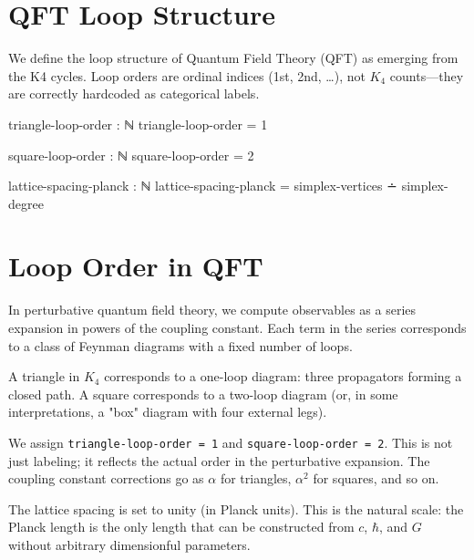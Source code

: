 \documentclass[11pt,a4paper]{book}
\begin{document}
\section{QFT Loop Structure}

We define the loop structure of Quantum Field Theory (QFT) as emerging from the K4 cycles.
Loop orders are ordinal indices (1st, 2nd, \ldots), not $K_4$ counts---they are correctly
hardcoded as categorical labels.

\begin{code}
triangle-loop-order : ℕ
triangle-loop-order = 1

square-loop-order : ℕ
square-loop-order = 2

lattice-spacing-planck : ℕ
lattice-spacing-planck = simplex-vertices ∸ simplex-degree
\end{code}

\section{Loop Order in QFT}

In perturbative quantum field theory, we compute observables as a series expansion in 
powers of the coupling constant. Each term in the series corresponds to a class of Feynman 
diagrams with a fixed number of loops.

A triangle in $K_4$ corresponds to a one-loop diagram: three propagators forming a closed 
path. A square corresponds to a two-loop diagram (or, in some interpretations, a "box" 
diagram with four external legs).

We assign \texttt{triangle-loop-order = 1} and \texttt{square-loop-order = 2}. This is 
not just labeling; it reflects the actual order in the perturbative expansion. The coupling 
constant corrections go as $\alpha$ for triangles, $\alpha^2$ for squares, and so on.

The lattice spacing is set to unity (in Planck units). This is the natural scale: the 
Planck length is the only length that can be constructed from $c$, $\hbar$, and $G$ without 
arbitrary dimensionful parameters.
\end{document}
